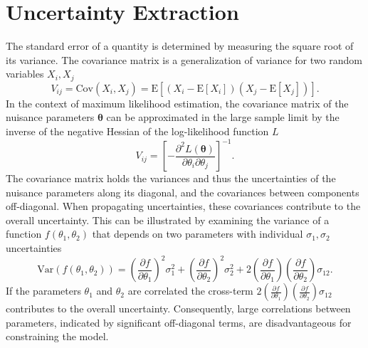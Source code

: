 \section{Uncertainty Extraction}\label{sec:unc_extraction}
The standard error of a quantity is determined by measuring the square root of its variance. The covariance matrix is a generalization of variance for two random variables $X_i, X_j$
\begin{equation}
    V_{ij}=\text{Cov}(X_i, X_j) = \text{E}[(X_i - \text{E}[X_i])(X_j - \text{E}[X_j])].
\end{equation}
In the context of maximum likelihood estimation, the covariance matrix of the nuisance parameters $\bm{\theta}$ can be approximated in the large sample limit by the inverse of the negative Hessian of the log-likelihood function $L$
\begin{equation}
    V_{ij} =\left[ -\frac{\partial^2 L(\bm{\theta})}{\partial \theta_i \partial \theta_j} \right]^{-1}.
\end{equation}
The covariance matrix holds the variances and thus the uncertainties of the nuisance parameters along its diagonal, and the covariances between components off-diagonal. When propagating uncertainties, these covariances contribute to the overall uncertainty. This can be illustrated by examining the variance of a function $f(\theta_1, \theta_2)$ that depends on two parameters with individual $\sigma_1,\sigma_2$ uncertainties
\begin{equation}
    \text{Var}(f(\theta_1, \theta_2)) = \left( \frac{\partial f}{\partial \theta_1} \right)^2 \sigma_1^2 + \left( \frac{\partial f}{\partial \theta_2} \right)^2 \sigma_2^2 + 2 \left( \frac{\partial f}{\partial \theta_1} \right) \left( \frac{\partial f}{\partial \theta_2} \right) \sigma_{12}.
\end{equation}
If the parameters $\theta_1$ and $\theta_2$ are correlated the cross-term \(2 \left( \frac{\partial f}{\partial \theta_1} \right) \left( \frac{\partial f}{\partial \theta_2} \right) \sigma_{12}\) contributes to the overall uncertainty. Consequently, large correlations between parameters, indicated by significant off-diagonal terms, are disadvantageous for constraining the model.



















